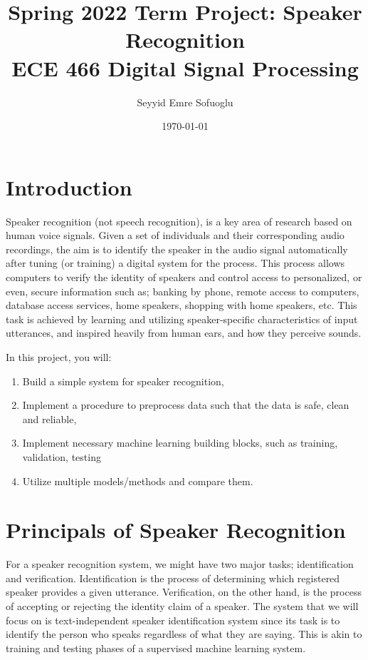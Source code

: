 \documentclass{article}
\title{Spring 2022 Term Project: Speaker Recognition\\ ECE 466 Digital Signal Processing}
\date{\today}
\author{Seyyid Emre Sofuoglu}
\begin{document}
\maketitle

\section{Introduction}
Speaker recognition (not speech recognition), is a key area of research based on human voice signals. Given a set of individuals and their corresponding audio recordings, the aim is to identify the speaker in the audio signal automatically after tuning (or training) a digital system for the process. This process allows computers to verify the identity of speakers and control access to personalized, or even, secure information such as; banking by phone, remote access to computers, database access services, home speakers, shopping with home speakers, etc. This task is achieved by learning and utilizing speaker-specific characteristics of input utterances, and inspired heavily from human ears, and how they perceive sounds.

In this project, you will:
\begin{enumerate}
    \item Build a simple system for speaker recognition,
    \item Implement a procedure to preprocess data such that the data is safe, clean and reliable,
    \item Implement necessary machine learning building blocks, such as training, validation, testing
    \item Utilize multiple models/methods and compare them.
\end{enumerate}

\section{Principals of Speaker Recognition}
For a speaker recognition system, we might have two major tasks; identification and verification. Identification is the process of determining which registered speaker provides a given utterance. Verification, on the other hand, is the process of accepting or rejecting the identity claim of a speaker. The system that we will focus on is text-independent speaker identification system since its task is to identify the person who speaks regardless of what they are saying. This is akin to training and testing phases of a supervised machine learning system.
\end{document}
